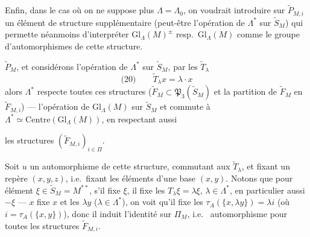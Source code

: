 \documentclass[11pt,a4paper]{article}
\begin{document}
Enfin, dans le cas où on ne suppose plus $\Lambda=\Lambda_0$, on voudrait introduire sur $\widetilde{P}_{M,i}$  un élément de structure supplémentaire (peut-être l'opération de $\Lambda^{*}$ sur $\widetilde{S}_M$) qui permette néanmoins d'interpréter $\mathrm{Gl}_\Lambda(M)^{\pm}$ resp.\ $\mathrm{Gl}_\Lambda(M)$ comme le groupe d'automorphismes de cette structure.

 

  $\widetilde{P}_M$, et considérons l'opération de $\Lambda^{*}$ sur $\widetilde{S}_M$, par les $\widetilde{T}_\lambda$
\[
\text{(20)}\qquad \widetilde{T}_\lambda x = \lambda\cdot x
\]
alors $\Lambda^{*}$ respecte toutes ces structures ($\widetilde{F}_M\subset\mathfrak{P}_3(\widetilde{S}_M)$ et la partition de $\widetilde{F}_M$ en $\widetilde{F}_{M,i}$) --- l'opération de $\mathrm{Gl}_\Lambda(M)$ sur $\widetilde{S}_M$ et commute à $\Lambda^{*}\simeq\mathrm{Centre}(\mathrm{Gl}_\Lambda(M))$, en respectant aussi

les structures $(\widetilde{F}_{M,i})_{i\in\Pi}$.

Soit $u$ un automorphisme de cette structure, commutant aux \struck{\ill{}} $\widetilde{T}_\lambda$, et fixant un repère $(x,y,z)$, i.e.\ fixant les éléments d'une base $(x,y)$.  Notons que pour  élément $\xi\in\widetilde{S}_M=M^{**}$, s'il fixe $\xi$, il fixe les $T_\lambda\xi=\lambda\xi$, $\lambda\in\Lambda^{*}$, en particulier aussi $-\xi$ --- \struck{\ill{}}     $x$ fixe $x$ et les $\lambda y$ ($\lambda\in\Lambda^{*}$), on voit qu'il  fixe les $\tau_A(\{x,\lambda y\})=\lambda i$ (où $i=\tau_A(\{x,y\})$), donc il induit l'identité sur $\Pi_M$, i.e.\ \struck{\ill{}}  automorphisme pour toutes les structures $\widetilde{F}_{M,i}$.
\end{document}
